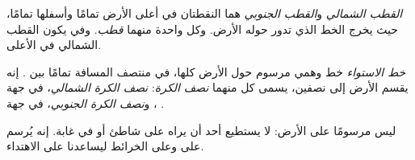 \begin{definition}[القطب]\label{def:g3:continents-and-oceans:poles}
\emph{القطب الشمالي} و\emph{القطب
الجنوبي} هما النقطتان في أعلى الأرض تمامًا وأسفلها
تمامًا، حيث يخرج الخط الذي تدور حوله الأرض. وكل واحدة منهما
\emph{قطب}. وفي  يكون القطب الشمالي في
الأعلى.
\end{definition}

\begin{definition}\label{def:g3:continents-and-oceans:equator}
\emph{خط الاستواء} خط وهمي مرسوم حول الأرض كلها، في
منتصف المسافة تمامًا بين  . إنه يقسم الأرض
إلى نصفين، يسمى كل منهما
\emph{نصف الكرة}: \emph{نصف الكرة
الشمالي}، في جهة ، و\emph{نصف
الكرة الجنوبي}، في جهة
.
\end{definition}

 ليس مرسومًا على الأرض: لا يستطيع أحد أن يراه على شاطئ أو في
غابة. إنه يُرسم على  وعلى الخرائط ليساعدنا على الاهتداء.


